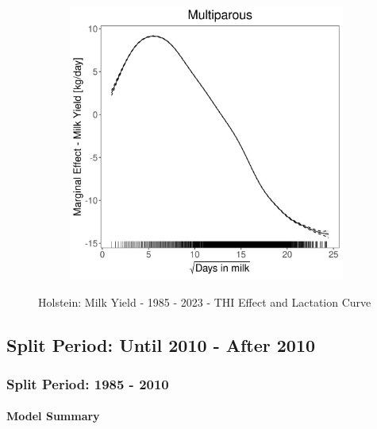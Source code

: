 \begin{figure}[H]
\begin{subfigure}[b]{0.45\textwidth}
    \end{subfigure}
    \hspace{0.05\textwidth} %
    \begin{subfigure}[b]{0.45\textwidth}
        \centering
        \includegraphics[width=\textwidth]{thesis/figures/models/milk/full/ho_milk_full/ho_milk_full_marginal_dim_milk_multi.png}
    \end{subfigure}
    \caption[]{Holstein: Milk Yield - 1985 - 2023 - THI Effect and Lactation Curve}
    \label{fig:main}
\end{figure}

\subsection{Split Period: Until 2010 - After 2010}
\subsubsection{Split Period: 1985 - 2010}\label{model:ho_milk_before}
\paragraph{Model Summary} \quad \\

